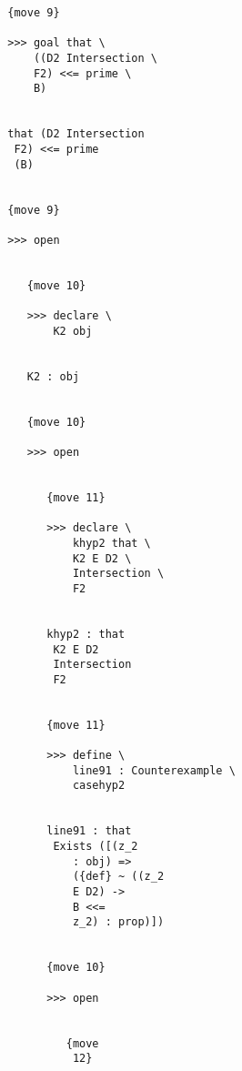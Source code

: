 \documentclass[12pt]{article}
\begin{document}
\begin{verbatim}
                           {move 9}

                           >>> goal that \
                               ((D2 Intersection \
                               F2) <<= prime \
                               B)


                           that (D2 Intersection 
                            F2) <<= prime 
                            (B)


                           {move 9}

                           >>> open


                              {move 10}

                              >>> declare \
                                  K2 obj


                              K2 : obj


                              {move 10}

                              >>> open


                                 {move 11}

                                 >>> declare \
                                     khyp2 that \
                                     K2 E D2 \
                                     Intersection \
                                     F2


                                 khyp2 : that 
                                  K2 E D2 
                                  Intersection 
                                  F2


                                 {move 11}

                                 >>> define \
                                     line91 : Counterexample \
                                     casehyp2


                                 line91 : that 
                                  Exists ([(z_2 
                                     : obj) => 
                                     ({def} ~ ((z_2 
                                     E D2) -> 
                                     B <<= 
                                     z_2) : prop)])


                                 {move 10}

                                 >>> open


                                    {move 
                                     12}


\end{verbatim}
\end{document}
